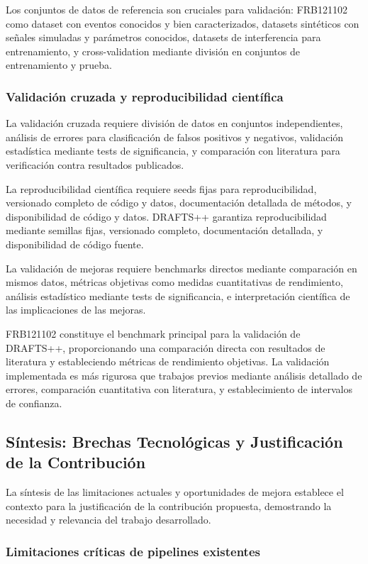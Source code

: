 Los conjuntos de datos de referencia son cruciales para validación: FRB121102 como dataset con eventos conocidos y bien caracterizados, datasets sintéticos con señales simuladas y parámetros conocidos, datasets de interferencia para entrenamiento, y cross-validation mediante división en conjuntos de entrenamiento y prueba.

\subsubsection{Validación cruzada y reproducibilidad científica}

La validación cruzada requiere división de datos en conjuntos independientes, análisis de errores para clasificación de falsos positivos y negativos, validación estadística mediante tests de significancia, y comparación con literatura para verificación contra resultados publicados.

La reproducibilidad científica requiere seeds fijas para reproducibilidad, versionado completo de código y datos, documentación detallada de métodos, y disponibilidad de código y datos. DRAFTS++ garantiza reproducibilidad mediante semillas fijas, versionado completo, documentación detallada, y disponibilidad de código fuente.

La validación de mejoras requiere benchmarks directos mediante comparación en mismos datos, métricas objetivas como medidas cuantitativas de rendimiento, análisis estadístico mediante tests de significancia, e interpretación científica de las implicaciones de las mejoras.

FRB121102 constituye el benchmark principal para la validación de DRAFTS++, proporcionando una comparación directa con resultados de literatura y estableciendo métricas de rendimiento objetivas. La validación implementada es más rigurosa que trabajos previos mediante análisis detallado de errores, comparación cuantitativa con literatura, y establecimiento de intervalos de confianza.

\subsection{Síntesis: Brechas Tecnológicas y Justificación de la Contribución}

La síntesis de las limitaciones actuales y oportunidades de mejora establece el contexto para la justificación de la contribución propuesta, demostrando la necesidad y relevancia del trabajo desarrollado.

\subsubsection{Limitaciones críticas de pipelines existentes}

